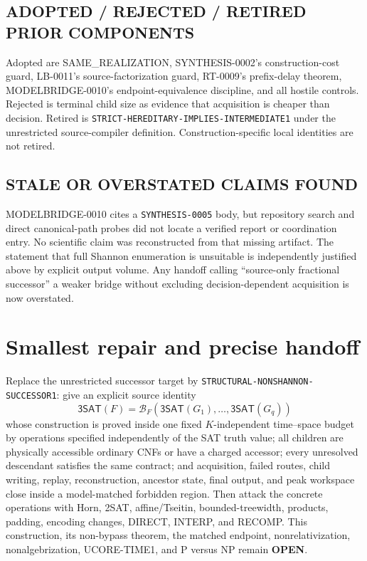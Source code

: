 \documentclass[11pt]{article}
\newcommand{\SAT}{\mathsf{3SAT}}
\newcommand{\OPEN}{\textbf{OPEN}}
\begin{document}
\subsection*{ADOPTED / REJECTED / RETIRED PRIOR COMPONENTS}
Adopted are SAME\_REALIZATION, SYNTHESIS-0002's construction-cost guard,
LB-0011's source-factorization guard, RT-0009's prefix-delay theorem,
MODELBRIDGE-0010's endpoint-equivalence discipline, and all hostile controls.
Rejected is terminal child size as evidence that acquisition is cheaper than
decision.  Retired is \texttt{STRICT-HEREDITARY-IMPLIES-INTERMEDIATE1} under
the unrestricted source-compiler definition.  Construction-specific local
identities are not retired.

\subsection*{STALE OR OVERSTATED CLAIMS FOUND}
MODELBRIDGE-0010 cites a \texttt{SYNTHESIS-0005} body, but repository search
and direct canonical-path probes did not locate a verified report or
coordination entry.  No scientific claim was reconstructed from that missing
artifact.  The statement that full Shannon enumeration is unsuitable is
independently justified above by explicit output volume.  Any handoff calling
``source-only fractional successor'' a weaker bridge without excluding
decision-dependent acquisition is now overstated.

\section{Smallest repair and precise handoff}

Replace the unrestricted successor target by
\texttt{STRUCTURAL-NONSHANNON-SUCCESSOR1}: give an explicit source identity
\[
 \SAT(F)=\mathcal B_F(\SAT(G_1),\ldots,\SAT(G_q))          \tag{3}
\]
whose construction is proved inside one fixed $K$-independent time--space
budget by operations specified independently of the SAT truth value; all
children are physically accessible ordinary CNFs or have a charged accessor;
every unresolved descendant satisfies the same contract; and acquisition,
failed routes, child writing, replay, reconstruction, ancestor state, final
output, and peak workspace close inside a model-matched forbidden region.
Then attack the concrete operations with Horn, 2SAT, affine/Tseitin,
bounded-treewidth, products, padding, encoding changes, DIRECT, INTERP, and
RECOMP.  This construction, its non-bypass theorem, the matched endpoint,
nonrelativization, nonalgebrization, UCORE-TIME1, and P versus NP remain
\OPEN.
\end{document}
